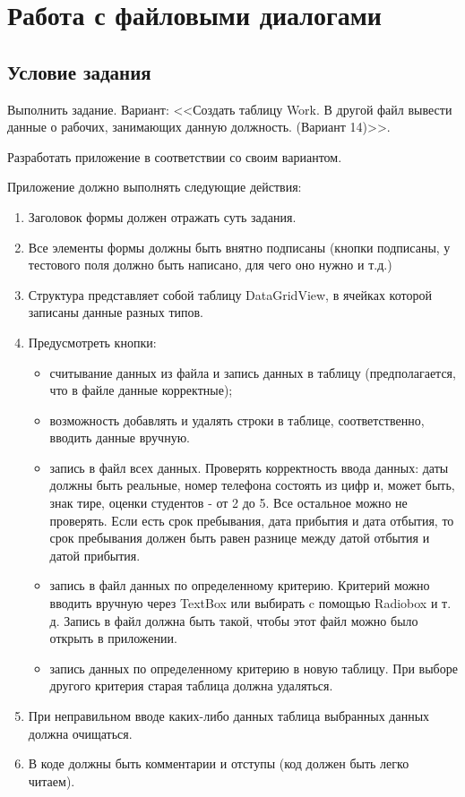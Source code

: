 \section{Работа с файловыми диалогами}
\subsection{Условие задания}
Выполнить задание. Вариант: <<Создать таблицу Work. В другой файл вывести данные о рабочих, занимающих данную должность. (Вариант 14)>>.

Разработать приложение в соответствии со своим вариантом.

Приложение должно выполнять следующие действия:

\begin{enumerate}
\item Заголовок формы должен отражать суть задания.
\item Все элементы формы должны быть внятно подписаны (кнопки подписаны, у тестового поля должно быть написано, для чего оно нужно и т.д.)
\item Структура представляет собой таблицу DataGridView, в ячейках которой записаны данные разных типов.
\item Предусмотреть кнопки:
\begin{itemize}
    \item считывание данных из файла и запись данных в таблицу (предполагается, что в файле данные корректные);
    \item возможность добавлять и удалять строки в таблице, соответственно, вводить данные вручную.
    \item запись в файл всех данных. Проверять корректность ввода данных: даты должны быть реальные, номер телефона состоять из цифр и, может быть, знак тире, оценки студентов - от 2 до 5. Все остальное можно не проверять. Если есть срок пребывания, дата прибытия и дата отбытия, то срок пребывания должен быть равен разнице между датой отбытия и датой прибытия.
    \item запись в файл данных по определенному критерию. Критерий можно вводить вручную через TextBox или выбирать c помощью Radiobox и т. д. Запись в файл должна быть такой, чтобы этот файл можно было открыть в приложении.
    \item запись данных по определенному критерию в новую таблицу. При выборе другого критерия старая таблица должна удаляться.
\end{itemize}
\item При неправильном вводе каких-либо данных таблица выбранных данных должна очищаться.
\item В коде должны быть комментарии и отступы (код должен быть легко читаем).
\end{enumerate}

